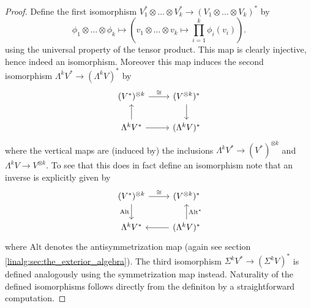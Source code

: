 \begin{proof}
	Define the first isomorphism $V_1^\ast \otimes \ldots \otimes V_k^\ast \to (V_1 \otimes \ldots \otimes V_k)^\ast $ by 
	\[
	\phi_1 \otimes \ldots \otimes \phi_k \mapsto \left(v_1 \otimes \ldots \otimes v_k \mapsto \prod_{i=1}^k \phi_i(v_i)\right).
	\]
	using the universal property of the tensor product. This map is clearly injective, hence indeed an isomorphism. Moreover this map induces the second isomorphism $\Lambda^k V^\ast \to (\Lambda^k V)^\ast$ by 
		\[\begin{tikzcd}
		{(V^\ast)^{\otimes k}} & {(V^{\otimes k})^\ast} \\
		{\Lambda^kV^\ast} & {(\Lambda^kV)^\ast}
		\arrow["\cong", from=1-1, to=1-2]
		\arrow[from=1-2, to=2-2]
		\arrow[from=2-1, to=1-1]
		\arrow[from=2-1, to=2-2]
		\end{tikzcd}\]
	where the vertical maps are (induced by) the inclusions $\Lambda^kV^\ast \to (V^\ast)^{\otimes k}$ and $\Lambda^kV \to V^{\otimes k}$. To see that this does in fact define an isomorphism note that an inverse is explicitly given by 
		\[\begin{tikzcd}
		{(V^\ast)^{\otimes k}} & {(V^{\otimes k})^\ast} \\
		{\Lambda^kV^\ast} & {(\Lambda^kV)^\ast}
		\arrow["\cong", from=1-1, to=1-2]
		\arrow["{\mathrm{Alt}}"', from=1-1, to=2-1]
		\arrow["{\mathrm{Alt}^\ast}"', from=2-2, to=1-2]
		\arrow[from=2-2, to=2-1]
		\end{tikzcd}\]
	where $\mathrm{Alt}$ denotes the antisymmetrization map (again see section \ref{linalg:sec:the_exterior_algebra}). The third isomorphism $\Sigma^k V^\ast \to (\Sigma^k V)^\ast$ is defined analogously using the symmetrization map instead. Naturality of the defined isomorphisms follows directly from the definiton by a straightforward computation.
\end{proof}